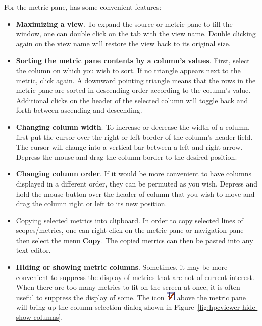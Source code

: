 For the metric pane, \hpcviewer{} has some convenient features:
\begin{itemize}

\item \textbf{Maximizing a view}.
  To expand the source or metric pane to fill the window, one can double click on the tab with the view name.
  Double clicking again on the view name will restore the view back to its original size.

\item \textbf{Sorting the metric pane contents by a column's values}.
  First, select the column on which you wish to sort.
  If no triangle appears next to the metric, click again.
  A downward pointing triangle means that the rows in the metric pane are sorted in descending order according to the column's value.
  Additional clicks on the header of the selected column will toggle back and forth between ascending and descending.

\item \textbf{Changing column width}.
  To increase or decrease the width of a column, first put the cursor over the right or left border of the column's header field.
  The cursor will change into a vertical bar between a left and right arrow.
  Depress the mouse and drag the column border to the desired position.

\item \textbf{Changing column order}.
  If it would be more convenient to have columns displayed in a different order, they can be permuted as you wish.
  Depress and hold the mouse button over the header of column that you wish to move and drag the column right or left to its new position.

\item Copying selected metrics into clipboard.
  In order to copy selected lines of scopes/metrics, one can right click on the metric pane or navigation pane then select the menu \textbf{Copy}.
  The copied metrics can then be pasted into any text editor.

\item \textbf{Hiding or showing metric columns}.
  Sometimes, it may be more convenient to suppress the display of metrics that are not of current interest.
  When there are too many metrics to fit on the screen at once, it is often useful to suppress the display of some.
  The icon \includegraphics[scale=.7]{fig/hpcviewer-button-checkcolumns.png} above the metric pane will bring up the column selection dialog shown in Figure~\ref{fig:hpcviewer-hide-show-columns}.


\end{itemize}
